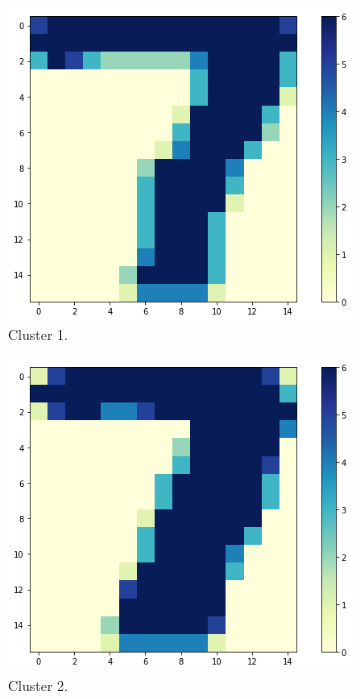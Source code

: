 \documentclass{article}
\begin{document}
\begin{figure}[h!]
    \centering
    \begin{subfigure}[b]{0.4\linewidth}
      \includegraphics[scale=0.4]{images/codebook_cluster4_1.png}
      \caption{Cluster 1.}
    \end{subfigure}\hspace{20.0}%
      \begin{subfigure}[b]{0.4\linewidth}
      \includegraphics[scale=0.4]{images/codebook_cluster4_2.png}
      \caption{Cluster 2.}
    \end{subfigure}\\[1ex]
    \begin{subfigure}[b]{0.4\linewidth}

\end{subfigure}
\end{figure}
\end{document}
